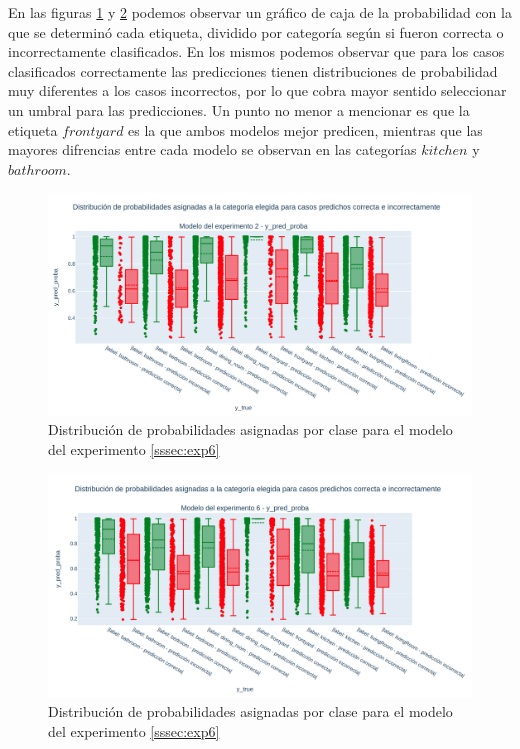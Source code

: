 En las figuras \ref{fig:results_exp_2_distribution_of_pred_proba} y \ref{fig:results_exp_6_distribution_of_pred_proba} podemos observar un gráfico de caja de la probabilidad con la que se determinó cada etiqueta, dividido por categoría según si fueron correcta o incorrectamente clasificados. En los mismos podemos observar que para los casos clasificados correctamente las predicciones tienen distribuciones de probabilidad muy diferentes a los casos incorrectos, por lo que cobra mayor sentido seleccionar un umbral para las predicciones. Un punto no menor a mencionar es que la etiqueta \(frontyard\) es la que ambos modelos mejor predicen, mientras que las mayores difrencias entre cada modelo se observan en las categorías \(kitchen\) y \(bathroom\). 

\begin{figure}[h!]
	\centering
	\includegraphics[width=1.1\linewidth]{images/results_exp_2_distribution_of_pred_proba}
	\caption{Distribución de probabilidades asignadas por clase para el modelo del experimento \ref{sssec:exp6}}
	\label{fig:results_exp_2_distribution_of_pred_proba}
\end{figure}

\begin{figure}[h!]
	\centering
	\includegraphics[width=1.1\linewidth]{images/results_exp_6_distribution_of_pred_proba}
	\caption{Distribución de probabilidades asignadas por clase para el modelo del experimento \ref{sssec:exp6}}
	\label{fig:results_exp_6_distribution_of_pred_proba}
\end{figure}


